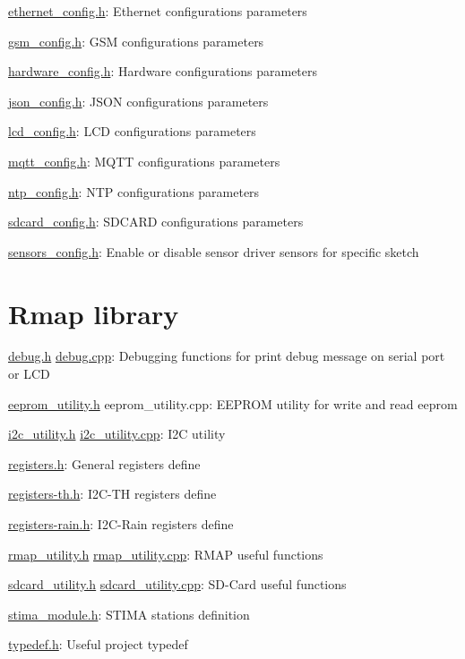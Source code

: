 \hyperlink{ethernet__config_8h}{ethernet\+\_\+config.\+h}\+: Ethernet configuration\textquotesingle{}s parameters

\hyperlink{gsm__config_8h}{gsm\+\_\+config.\+h}\+: G\+SM configuration\textquotesingle{}s parameters

\hyperlink{hardware__config_8h}{hardware\+\_\+config.\+h}\+: Hardware configuration\textquotesingle{}s parameters

\hyperlink{json__config_8h}{json\+\_\+config.\+h}\+: J\+S\+ON configuration\textquotesingle{}s parameters

\hyperlink{lcd__config_8h}{lcd\+\_\+config.\+h}\+: L\+CD configuration\textquotesingle{}s parameters

\hyperlink{mqtt__config_8h}{mqtt\+\_\+config.\+h}\+: M\+Q\+TT configuration\textquotesingle{}s parameters

\hyperlink{ntp__config_8h}{ntp\+\_\+config.\+h}\+: N\+TP configuration\textquotesingle{}s parameters

\hyperlink{sdcard__config_8h}{sdcard\+\_\+config.\+h}\+: S\+D\+C\+A\+RD configuration\textquotesingle{}s parameters

\hyperlink{sensors__config_8h}{sensors\+\_\+config.\+h}\+: Enable or disable sensor driver sensors for specific sketch\hypertarget{index_Rmap}{}\section{Rmap library}\label{index_Rmap}
\hyperlink{debug_8h}{debug.\+h} \hyperlink{debug_8cpp}{debug.\+cpp}\+: Debugging functions for print debug message on serial port or L\+CD

\hyperlink{eeprom__utility_8h}{eeprom\+\_\+utility.\+h} eeprom\+\_\+utility.\+cpp\+: E\+E\+P\+R\+OM utility for write and read eeprom

\hyperlink{i2c__utility_8h}{i2c\+\_\+utility.\+h} \hyperlink{i2c__utility_8cpp}{i2c\+\_\+utility.\+cpp}\+: I2C utility

\hyperlink{registers_8h}{registers.\+h}\+: General register\textquotesingle{}s define

\hyperlink{registers-th_8h}{registers-\/th.\+h}\+: I2\+C-\/\+TH register\textquotesingle{}s define

\hyperlink{registers-rain_8h}{registers-\/rain.\+h}\+: I2\+C-\/\+Rain register\textquotesingle{}s define

\hyperlink{rmap__utility_8h}{rmap\+\_\+utility.\+h} \hyperlink{rmap__utility_8cpp}{rmap\+\_\+utility.\+cpp}\+: R\+M\+AP useful functions

\hyperlink{sdcard__utility_8h}{sdcard\+\_\+utility.\+h} \hyperlink{sdcard__utility_8cpp}{sdcard\+\_\+utility.\+cpp}\+: S\+D-\/\+Card useful functions

\hyperlink{stima__module_8h}{stima\+\_\+module.\+h}\+: S\+T\+I\+MA station\textquotesingle{}s definition

\hyperlink{typedef_8h}{typedef.\+h}\+: Useful project typedef 